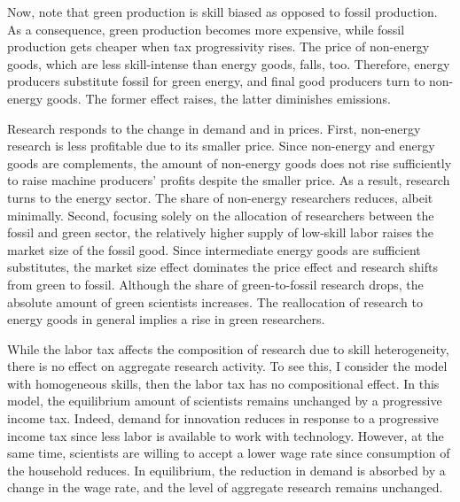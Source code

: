 Now, note that green production is skill biased as opposed to fossil production.
As a  consequence, green production becomes more expensive, while fossil production gets cheaper when tax progressivity rises. The price of non-energy goods, which are less skill-intense than energy goods, falls, too. Therefore, energy producers substitute fossil for green energy, and final good producers turn to non-energy goods. The former effect raises, the latter diminishes emissions.


Research responds to the change in demand and in prices. First, non-energy research is less profitable due to its smaller price. Since non-energy and energy goods are complements, the amount of non-energy goods does not rise sufficiently to raise machine producers' profits despite the smaller price. As a result, research turns to the energy sector. The share of non-energy researchers reduces, albeit minimally. %
Second, focusing solely on the allocation of researchers between the fossil and green sector, the relatively higher supply of low-skill labor raises the market size of the fossil good. Since intermediate energy goods are sufficient substitutes, the market size effect dominates the price effect and research shifts from green to fossil.
Although the share of green-to-fossil research drops, the absolute amount of green scientists increases. The reallocation of research to energy goods in general implies a rise in green researchers. 

While the labor tax affects the composition of research due to skill heterogeneity, there is no effect on aggregate research activity. 
To see this, I consider the model with homogeneous skills, then the labor tax has no compositional effect. In this model, the equilibrium amount of scientists remains unchanged by a progressive income tax. Indeed, demand for innovation reduces in response to a progressive income tax since less labor is available to work with technology. However, at the same time, scientists are willing to accept a lower wage rate since consumption of the household reduces. In equilibrium, the reduction in demand is absorbed by a change in the wage rate, and the level of aggregate research remains unchanged. 



